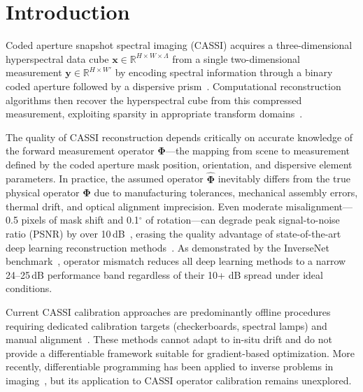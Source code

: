 \documentclass[runningheads]{llncs}
\begin{document}
\section{Introduction}
\label{sec:intro}

Coded aperture snapshot spectral imaging (CASSI) acquires a three-dimensional hyperspectral data cube $\mathbf{x} \in \mathbb{R}^{H \times W \times \Lambda}$ from a single two-dimensional measurement $\mathbf{y} \in \mathbb{R}^{H \times W'}$ by encoding spectral information through a binary coded aperture followed by a dispersive prism~\cite{wagadarikar2008cassi,gehm2007cassi}.
Computational reconstruction algorithms then recover the hyperspectral cube from this compressed measurement, exploiting sparsity in appropriate transform domains~\cite{yuan2016gaptv,cai2022mst}.

The quality of CASSI reconstruction depends critically on accurate knowledge of the forward measurement operator $\mathbf{\Phi}$---the mapping from scene to measurement defined by the coded aperture mask position, orientation, and dispersive element parameters.
In practice, the assumed operator $\hat{\mathbf{\Phi}}$ inevitably differs from the true physical operator $\mathbf{\Phi}$ due to manufacturing tolerances, mechanical assembly errors, thermal drift, and optical alignment imprecision.
Even moderate misalignment---0.5 pixels of mask shift and 0.1$^\circ$ of rotation---can degrade peak signal-to-noise ratio (PSNR) by over 10\,dB~\cite{wagadarikar2008cassi}, erasing the quality advantage of state-of-the-art deep learning reconstruction methods~\cite{cai2022mst,hu2022hdnet}.
As demonstrated by the InverseNet benchmark~\cite{yang2025inversenet}, operator mismatch reduces all deep learning methods to a narrow 24--25\,dB performance band regardless of their 10+ dB spread under ideal conditions.

Current CASSI calibration approaches are predominantly offline procedures requiring dedicated calibration targets (checkerboards, spectral lamps) and manual alignment~\cite{arguello2013cassi_calib,kittle2010cassi_design}.
These methods cannot adapt to in-situ drift and do not provide a differentiable framework suitable for gradient-based optimization.
More recently, differentiable programming has been applied to inverse problems in imaging~\cite{gilton2021deep_eq,monga2021unrolled}, but its application to CASSI operator calibration remains unexplored.
\end{document}
